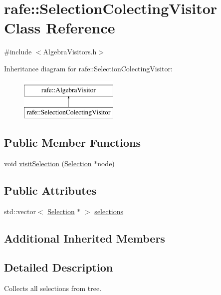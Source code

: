 \hypertarget{classrafe_1_1_selection_colecting_visitor}{\section{rafe\+:\+:Selection\+Colecting\+Visitor Class Reference}
\label{classrafe_1_1_selection_colecting_visitor}
}


{\ttfamily \#include $<$Algebra\+Visitors.\+h$>$}

Inheritance diagram for rafe\+:\+:Selection\+Colecting\+Visitor\+:\begin{figure}[H]
\begin{center}
\leavevmode
\includegraphics[height=2.000000cm]{classrafe_1_1_selection_colecting_visitor}
\end{center}
\end{figure}
\subsection*{Public Member Functions}
\begin{DoxyCompactItemize}
\item 
void \hyperlink{classrafe_1_1_selection_colecting_visitor_a6789a4d32c1bb3b4b67ed6aa92c456df}{visit\+Selection} (\hyperlink{classrafe_1_1_selection}{Selection} $\ast$node)
\end{DoxyCompactItemize}
\subsection*{Public Attributes}
\begin{DoxyCompactItemize}
\item 
std\+::vector$<$ \hyperlink{classrafe_1_1_selection}{Selection} $\ast$ $>$ \hyperlink{classrafe_1_1_selection_colecting_visitor_ac308064f16452658a11373e2c241cdbf}{selections}
\end{DoxyCompactItemize}
\subsection*{Additional Inherited Members}


\subsection{Detailed Description}
Collects all selections from tree. 

